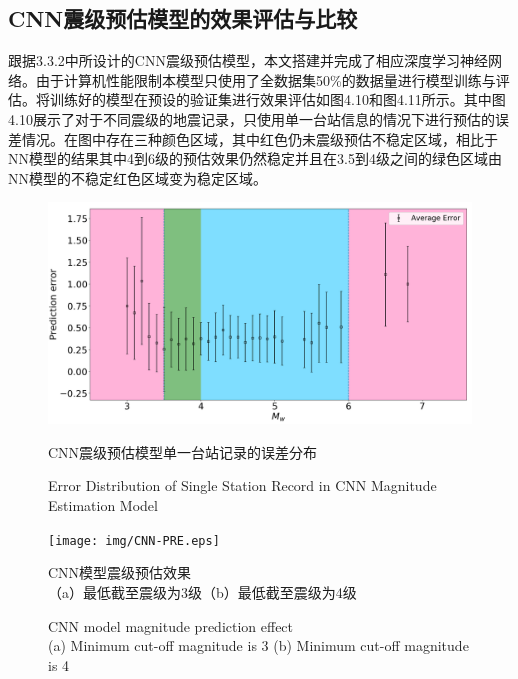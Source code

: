 \subsection{CNN震级预估模型的效果评估与比较}
\indent 跟据3.3.2中所设计的CNN震级预估模型，本文搭建并完成了相应深度学习神经网络。由于计算机性能限制本模型只使用了全数据集50\%的数据量进行模型训练与评估。将训练好的模型在预设的验证集进行效果评估如图4.10和图4.11所示。其中图4.10展示了对于不同震级的地震记录，只使用单一台站信息的情况下进行预估的误差情况。在图中存在三种颜色区域，其中红色仍未震级预估不稳定区域，相比于NN模型的结果其中4到6级的预估效果仍然稳定并且在3.5到4级之间的绿色区域由NN模型的不稳定红色区域变为稳定区域。\\
\begin{figure}[!h] 
\centering 
 \includegraphics[width=\linewidth]{img/eb1_cnn.png} 
 \renewcommand{\figurename}{图} 
\caption{CNN震级预估模型单一台站记录的误差分布} 
\addtocounter{figure}{-1} \vspace{-5pt} 
\renewcommand{\figurename}{Fig} 
\caption{Error Distribution of Single Station Record in CNN Magnitude Estimation Model} 
\renewcommand{\figurename}{图} 
\label{fig:network-device-influence.png} 
\end{figure}
\begin{figure}[!h] 
\centering 
 \texttt{[image: img/CNN-PRE.eps]} 
 \renewcommand{\figurename}{图} 
\caption{CNN模型震级预估效果\\
（a）最低截至震级为3级（b）最低截至震级为4级} 
\addtocounter{figure}{-1} \vspace{-5pt} 
\renewcommand{\figurename}{Fig} 
\caption{CNN model magnitude prediction effect\\
(a) Minimum cut-off magnitude is 3 (b) Minimum cut-off magnitude is 4} 
\renewcommand{\figurename}{图} 
\label{fig:network-device-influence.png} 
\end{figure}
